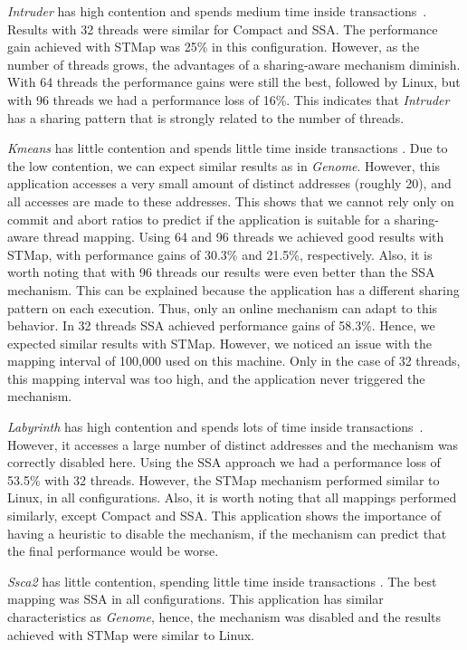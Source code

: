 \emph{Intruder} has high contention and spends medium time inside transactions~\cite{STAMP}. Results with 32 threads were similar for Compact and SSA. The performance gain achieved with STMap was 25\% in this configuration. However, as the number of threads grows, the advantages of a sharing-aware mechanism diminish. With 64 threads the performance gains were still the best, followed by Linux, but with 96 threads we had a performance loss of 16\%. This indicates that \emph{Intruder} has a sharing pattern that is strongly related to the number of threads.

\emph{Kmeans} has little contention and spends little time inside transactions \cite{STAMP}. Due to the low contention, we can expect similar results as in \emph{Genome}. However, this application accesses a very small amount of distinct addresses (roughly 20), and all accesses are made to these addresses. This shows that we cannot rely only on commit and abort ratios to predict if the application is suitable for a sharing-aware thread mapping. Using 64 and 96 threads we achieved good results with STMap, with performance gains of 30.3\% and 21.5\%, respectively. Also, it is worth noting that with 96 threads our results were even better than the SSA mechanism. This can be explained because the application has a different sharing pattern on each execution. Thus, only an online mechanism can adapt to this behavior. In 32 threads SSA achieved performance gains of 58.3\%. Hence, we expected similar results with STMap. However, we noticed an issue with the mapping interval of 100,000 used on this machine. Only in the case of 32 threads, this mapping interval was too high, and the application never triggered the mechanism. 

\emph{Labyrinth} has high contention and spends lots of time inside transactions~\cite{STAMP}. However, it accesses a large number of distinct addresses and the mechanism was correctly disabled here. Using the SSA approach we had a performance loss of 53.5\% with 32 threads. However, the STMap mechanism performed similar to Linux, in all configurations. Also, it is worth noting that all mappings performed similarly, except Compact and SSA. This application shows the importance of having a heuristic to disable the mechanism, if the mechanism can predict that the final performance would be worse.

\emph{Ssca2} has little contention, spending little time inside transactions \cite{STAMP}. The best mapping was SSA in all configurations. This application has similar characteristics as \emph{Genome}, hence, the mechanism was disabled and the results achieved with STMap were similar to Linux.


